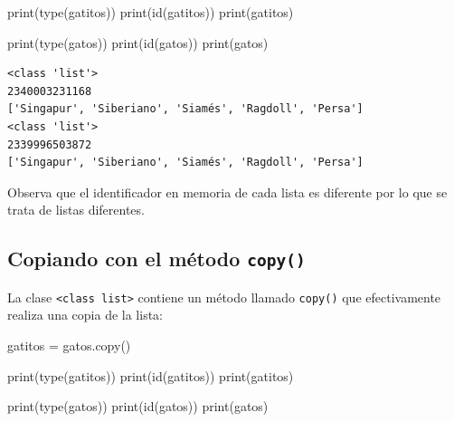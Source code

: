 \documentclass[
  spanish,
  letterpaper,
]{scrbook}
\newenvironment{Shaded}{\begin{snugshade}}{\end{snugshade}}
\newcommand{\BuiltInTok}[1]{\textcolor[rgb]{0.00,0.23,0.31}{#1}}
\newcommand{\NormalTok}[1]{\textcolor[rgb]{0.00,0.23,0.31}{#1}}
\newcommand{\OperatorTok}[1]{\textcolor[rgb]{0.37,0.37,0.37}{#1}}
\theoremstyle{definition}
\theoremstyle{remark}
\begin{document}
\begin{Shaded}
\begin{Highlighting}[]
\BuiltInTok{print}\NormalTok{(}\BuiltInTok{type}\NormalTok{(gatitos))}
\BuiltInTok{print}\NormalTok{(}\BuiltInTok{id}\NormalTok{(gatitos))}
\BuiltInTok{print}\NormalTok{(gatitos)}

\BuiltInTok{print}\NormalTok{(}\BuiltInTok{type}\NormalTok{(gatos))}
\BuiltInTok{print}\NormalTok{(}\BuiltInTok{id}\NormalTok{(gatos))}
\BuiltInTok{print}\NormalTok{(gatos)}
\end{Highlighting}
\end{Shaded}

\begin{verbatim}
<class 'list'>
2340003231168
['Singapur', 'Siberiano', 'Siamés', 'Ragdoll', 'Persa']
<class 'list'>
2339996503872
['Singapur', 'Siberiano', 'Siamés', 'Ragdoll', 'Persa']
\end{verbatim}

Observa que el identificador en memoria de cada lista es diferente por
lo que se trata de listas diferentes.

\subsection{\texorpdfstring{Copiando con el método
\texttt{copy()}}{Copiando con el método copy()}}\label{copiando-con-el-muxe9todo-copy}

La clase
\texttt{\textless{}class\ \textquotesingle{}list\textquotesingle{}\textgreater{}}
contiene un método llamado \texttt{copy()} que efectivamente realiza una
copia de la lista:

\begin{Shaded}
\begin{Highlighting}[]
\NormalTok{gatitos }\OperatorTok{=}\NormalTok{ gatos.copy()}
\end{Highlighting}
\end{Shaded}

\begin{Shaded}
\begin{Highlighting}[]
\BuiltInTok{print}\NormalTok{(}\BuiltInTok{type}\NormalTok{(gatitos))}
\BuiltInTok{print}\NormalTok{(}\BuiltInTok{id}\NormalTok{(gatitos))}
\BuiltInTok{print}\NormalTok{(gatitos)}

\BuiltInTok{print}\NormalTok{(}\BuiltInTok{type}\NormalTok{(gatos))}
\BuiltInTok{print}\NormalTok{(}\BuiltInTok{id}\NormalTok{(gatos))}
\BuiltInTok{print}\NormalTok{(gatos)}
\end{Highlighting}
\end{Shaded}
\end{document}
